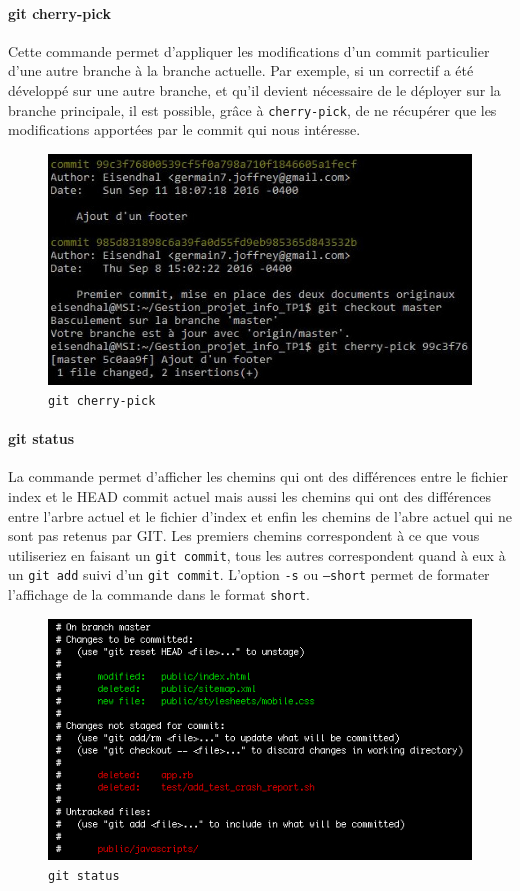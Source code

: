 \documentclass[11pt,canadien]{article}
\begin{document}
\paragraph{git cherry-pick}Cette commande permet d'appliquer les modifications d'un commit particulier d'une autre branche à la branche actuelle. Par exemple, si un correctif a été développé sur une autre branche, et qu'il devient nécessaire de le déployer sur la branche principale, il est possible, grâce à \texttt{cherry-pick}, de ne récupérer que les modifications apportées par le commit qui nous intéresse.
\begin{figure}[h]
	\centering
	\includegraphics[width=\textwidth]{images/git_cherry-pick.jpg}
	\caption{\texttt{git cherry-pick}}
	\label{fig:git_cherry-pick}
\end{figure}

\paragraph{git status}La commande permet d'afficher les chemins qui ont des différences entre le fichier index et le HEAD commit actuel mais aussi les chemins qui ont des différences entre l'arbre actuel et le fichier d'index et enfin les chemins de l'abre actuel qui ne sont pas retenus par GIT. Les premiers chemins correspondent à ce que vous utiliseriez en faisant un \texttt{git commit}, tous les autres correspondent quand à eux à un \texttt{git add} suivi d'un \texttt{git commit}. L'option \texttt{-s} ou \texttt{--short} permet de formater l'affichage de la commande dans le format \texttt{short}.
\begin{figure}[h]
	\centering
	\includegraphics[width=\textwidth]{images/git-status.gif}
	\caption{\texttt{git status}}
	\label{fig:git_status}
\end{figure}
\end{document}
